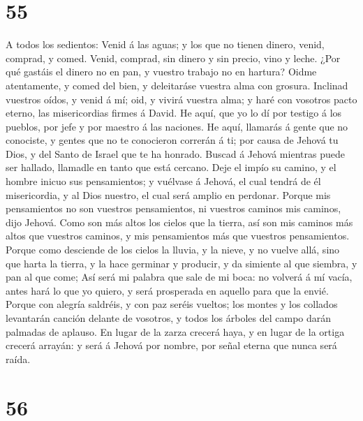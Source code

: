 \hypertarget{section-54}{%
\section{55}\label{section-54}}

 A todos los sedientos: Venid á las aguas; y los que no
tienen dinero, venid, comprad, y comed. Venid, comprad, sin dinero y sin
precio, vino y leche.  ¿Por qué gastáis el dinero no en pan,
y vuestro trabajo no en hartura? Oidme atentamente, y comed del bien, y
deleitaráse vuestra alma con grosura.  Inclinad vuestros
oídos, y venid á mí; oid, y vivirá vuestra alma; y haré con vosotros
pacto eterno, las misericordias firmes á David.  He aquí,
que yo lo dí por testigo á los pueblos, por jefe y por maestro á las
naciones.  He aquí, llamarás á gente que no conociste, y
gentes que no te conocieron correrán á ti; por causa de Jehová tu Dios,
y del Santo de Israel que te ha honrado.  Buscad á Jehová
mientras puede ser hallado, llamadle en tanto que está cercano.
 Deje el impío su camino, y el hombre inicuo sus
pensamientos; y vuélvase á Jehová, el cual tendrá de él misericordia, y
al Dios nuestro, el cual será amplio en perdonar.  Porque
mis pensamientos no son vuestros pensamientos, ni vuestros caminos mis
caminos, dijo Jehová.  Como son más altos los cielos que la
tierra, así son mis caminos más altos que vuestros caminos, y mis
pensamientos más que vuestros pensamientos.  Porque como
desciende de los cielos la lluvia, y la nieve, y no vuelve allá, sino
que harta la tierra, y la hace germinar y producir, y da simiente al que
siembra, y pan al que come;  Así será mi palabra que sale
de mi boca: no volverá á mí vacía, antes hará lo que yo quiero, y será
prosperada en aquello para que la envié.  Porque con
alegría saldréis, y con paz seréis vueltos; los montes y los collados
levantarán canción delante de vosotros, y todos los árboles del campo
darán palmadas de aplauso.  En lugar de la zarza crecerá
haya, y en lugar de la ortiga crecerá arrayán: y será á Jehová por
nombre, por señal eterna que nunca será raída.

\hypertarget{section-55}{%
\section{56}\label{section-55}}

